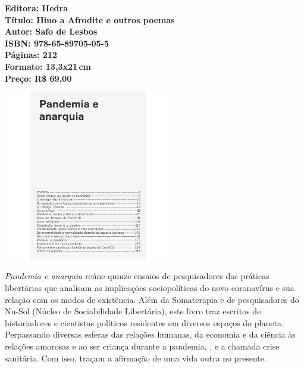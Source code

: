 \vfill
\noindent\begin{minipage}[c]{1\linewidth}
{\small\textbf{
\hspace*{-.1cm}Editora: Hedra\\
Título: Hino a Afrodite e outros poemas\\
Autor: Safo de Lesbos\\ 
ISBN: 978-65-89705-05-5\\
Páginas: 212\\
Formato: 13,3x21\,cm\\
Preço: R\$ 69,00\\
}}
\end{minipage}
\pagebreak

\begin{center}
\hspace*{.5cm}\includegraphics[width=74mm]{./CAPAS/HEDRA_PANDEMIA.jpg}
\end{center}
\hspace*{-7cm}\hrulefill\hspace*{-7cm}
\medskip

\noindent{}\textit{Pandemia e anarquia} reúne quinze ensaios de pesquisadores das práticas libertárias que analisam as implicações sociopolíticas do novo coronavírus e sua relação com os modos de existência. Além da Somaterapia e de pesquisadores do Nu-Sol (Núcleo de Sociabilidade Libertária), este livro traz escritos de historiadores e cientistas políticos residentes em diversos espaços do planeta. Perpassando diversas esferas das relações humanas, da economia e da ciência às relações amorosas e ao ser criança durante a pandemia, , e a chamada crise sanitária. Com isso, traçam a afirmação de uma vida outra no presente.

